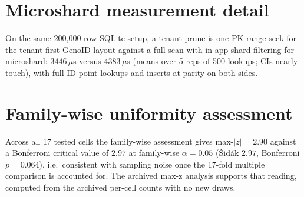\documentclass[11pt]{article}
\begin{document}
\section{Microshard measurement detail}
On the same
200{,}000-row SQLite setup, a tenant prune is one PK range seek for the
tenant-first GenoID layout against a full scan with in-app shard filtering
for microshard:
$3446\,\mu$s versus $4383\,\mu$s (means over 5 reps of 500 lookups; CIs
nearly touch), with full-ID
point lookups and inserts at parity on both sides.

\section{Family-wise uniformity assessment}
Across all 17 tested cells the family-wise assessment gives max-$|z|=2.90$ against a Bonferroni critical value of $2.97$ at family-wise $\alpha=0.05$ (\v{S}id\'ak $2.97$, Bonferroni $p=0.064$), i.e.\ consistent with sampling noise once the 17-fold multiple comparison is accounted for. The archived max-z analysis supports that reading, computed from the archived per-cell counts with no new draws.
\end{document}
